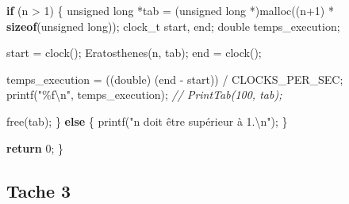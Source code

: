 \documentclass[
]{article}
\newenvironment{Shaded}{}{}
\newcommand{\CommentTok}[1]{\textcolor[rgb]{0.38,0.63,0.69}{\textit{#1}}}
\newcommand{\ControlFlowTok}[1]{\textcolor[rgb]{0.00,0.44,0.13}{\textbf{#1}}}
\newcommand{\DataTypeTok}[1]{\textcolor[rgb]{0.56,0.13,0.00}{#1}}
\newcommand{\DecValTok}[1]{\textcolor[rgb]{0.25,0.63,0.44}{#1}}
\newcommand{\KeywordTok}[1]{\textcolor[rgb]{0.00,0.44,0.13}{\textbf{#1}}}
\newcommand{\NormalTok}[1]{#1}
\newcommand{\SpecialCharTok}[1]{\textcolor[rgb]{0.25,0.44,0.63}{#1}}
\newcommand{\StringTok}[1]{\textcolor[rgb]{0.25,0.44,0.63}{#1}}
\begin{document}
\begin{Shaded}
\begin{Highlighting}[]
    \ControlFlowTok{if}\NormalTok{ (n \textgreater{} }\DecValTok{1}\NormalTok{) \{}
        \DataTypeTok{unsigned} \DataTypeTok{long}\NormalTok{ *tab = (}\DataTypeTok{unsigned} \DataTypeTok{long}\NormalTok{ *)malloc((n+}\DecValTok{1}\NormalTok{) * }\KeywordTok{sizeof}\NormalTok{(}\DataTypeTok{unsigned} \DataTypeTok{long}\NormalTok{));}
\NormalTok{        clock\_t start, end;}
        \DataTypeTok{double}\NormalTok{ temps\_execution;}

\NormalTok{        start = clock();}
\NormalTok{        Eratosthenes(n, tab);}
\NormalTok{        end = clock();}

\NormalTok{        temps\_execution = ((}\DataTypeTok{double}\NormalTok{) (end {-} start)) / CLOCKS\_PER\_SEC;}
\NormalTok{        printf(}\StringTok{"\%f}\SpecialCharTok{\textbackslash{}n}\StringTok{"}\NormalTok{, temps\_execution);}
        \CommentTok{// PrintTab(100, tab);}

\NormalTok{        free(tab);}
\NormalTok{    \} }\ControlFlowTok{else}\NormalTok{ \{}
\NormalTok{        printf(}\StringTok{"n doit être supérieur à 1.}\SpecialCharTok{\textbackslash{}n}\StringTok{"}\NormalTok{);}
\NormalTok{    \}}

    \ControlFlowTok{return} \DecValTok{0}\NormalTok{;}
\NormalTok{\}}
\end{Highlighting}
\end{Shaded}

\pagebreak

\hypertarget{tache-3}{%
\subsection{Tache 3}\label{tache-3}}
\end{document}
